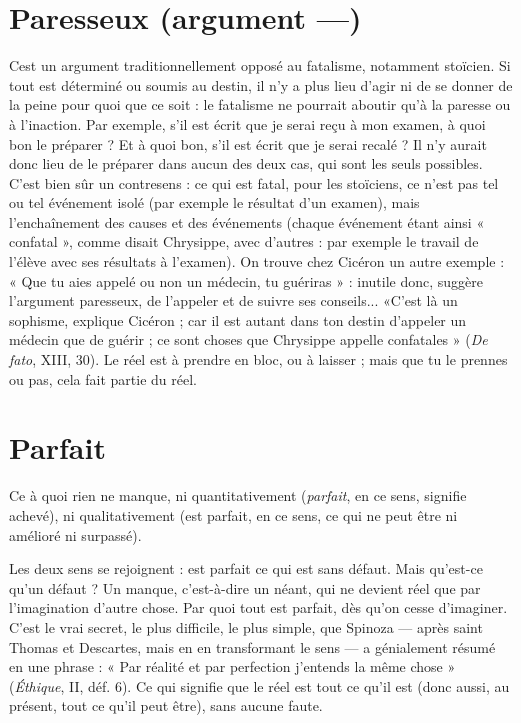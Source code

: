 \section{Paresseux (argument —)}
Cest un argument traditionnellement opposé
au fatalisme, notamment stoïcien. Si tout
est déterminé ou soumis au destin, il n’y a plus lieu d’agir ni de se donner de la
peine pour quoi que ce soit : le fatalisme ne pourrait aboutir qu’à la paresse ou
à l’inaction. Par exemple, s’il est écrit que je serai reçu à mon examen, à quoi
bon le préparer ? Et à quoi bon, s’il est écrit que je serai recalé ? Il n’y aurait
donc lieu de le préparer dans aucun des deux cas, qui sont les seuls possibles.
C'est bien sûr un contresens : ce qui est fatal, pour les stoïciens, ce n’est pas tel
ou tel événement isolé (par exemple le résultat d’un examen), mais l’enchaînement
des causes et des événements (chaque événement étant ainsi « confatal »,
comme disait Chrysippe, avec d’autres : par exemple le travail de l'élève avec ses
résultats à l’examen). On trouve chez Cicéron un autre exemple : « Que tu aies
appelé ou non un médecin, tu guériras » : inutile donc, suggère l'argument
paresseux, de l'appeler et de suivre ses conseils... «C’est là un sophisme,
explique Cicéron ; car il est autant dans ton destin d’appeler un médecin que
de guérir ; ce sont choses que Chrysippe appelle confatales » ({\it De fato}, XIII, 30).
Le réel est à prendre en bloc, ou à laisser ; mais que tu le prennes ou pas, cela
fait partie du réel.

\section{Parfait}
Ce à quoi rien ne manque, ni quantitativement ({\it parfait}, en ce sens,
signifie achevé), ni qualitativement (est parfait, en ce sens, ce qui
ne peut être ni amélioré ni surpassé).

Les deux sens se rejoignent : est parfait ce qui est sans défaut. Mais qu’est-ce
qu’un défaut ? Un manque, c’est-à-dire un néant, qui ne devient réel que par
l'imagination d’autre chose. Par quoi tout est parfait, dès qu’on cesse d’imaginer.
C’est le vrai secret, le plus difficile, le plus simple, que Spinoza — après
saint Thomas et Descartes, mais en en transformant le sens — a génialement
résumé en une phrase : « Par réalité et par perfection j’entends la même chose »
({\it Éthique}, II, déf. 6). Ce qui signifie que le réel est tout ce qu’il est (donc aussi,
au présent, tout ce qu’il peut être), sans aucune faute.

